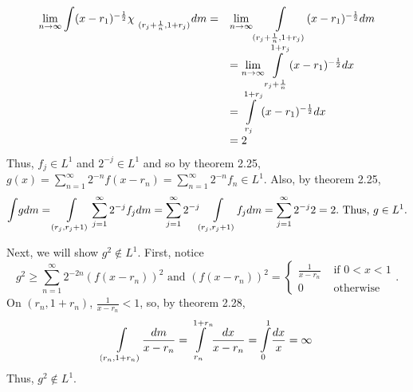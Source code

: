\begin{enumerate}
\begin{pf}
\[\begin{array}{ll}
 \lim\limits_{n \rightarrow \infty}\mathlarger{\int} (x-r_1)^{-\frac{1}{2}} \mathlarger{\chi}_{\ _\mathlarger{(r_j+ \frac{1}{n}, 1+ r_j)}}dm =& \lim\limits_{n \rightarrow \infty} \mathlarger{\int\limits}_{(r_j+ \frac{1}{n}, 1+ r_j)} (x-r_1)^{-\frac{1}{2}} dm \\
 &=\lim\limits_{n \rightarrow \infty} \mathlarger{\int\limits}_{r_j+ \frac{1}{n}}^{1+ r_j}(x-r_1)^{-\frac{1}{2}} dx\\
&=  \mathlarger{\int\limits}_{r_j}^{1+ r_j}(x-r_1)^{-\frac{1}{2}} dx\\
&=2\\
\end{array}
\]
Thus, $f_j \in L^1$ and $2^{-j} \in L^1$ and so by theorem 2.25, $g(x)=\sum_{n=1}^\infty 2^{-n}f(x-r_n)=\sum_{n=1}^\infty 2^{-n}f_n \in L^1$. Also, by theorem 2.25,
\[
\mathlarger{\int}gdm = \mathlarger{\int\limits}_{(r_j, r_j+1)}\sum_{j=1}^\infty 2^{-j}f_j dm = \sum_{j=1}^\infty 2^{-j}\mathlarger{\int\limits}_{(r_j, r_j+1)}f_j dm=\sum_{j=1}^\infty 2^{-j}2=2. \text{ Thus, } g\in L^1. 
\]
\end{pf}
\begin{pf}
Next, we will show $g^2 \not\in L^1$. First, notice \[
g^2 \geq \sum_{n=1}^\infty2^{-2n}(f(x-r_n))^2 \text{ and } (f(x-r_n))^2 = \left\{ \begin{array}{ll}
 \frac{1}{x-r_n} & \text{ if } 0 < x < 1 \\
 0 & \text{ otherwise } 
 \end{array}\right. .
\]	
On $(r_n,1+r_n)$, $\frac{1}{x-r_n}<1$, so, by theorem 2.28, 
\[
\mathlarger{\int\limits}_{(r_n,1+r_n)}\frac{dm}{x-r_n}=\mathlarger{\int\limits}_{r_n}^{1+r_n}\frac{dx}{x-r_n}=\mathlarger{\int\limits}_{0}^{1}\frac{dx}{x}= \infty
\]
Thus, $g^2 \not \in L^1$.
\end{pf}


\end{enumerate}

